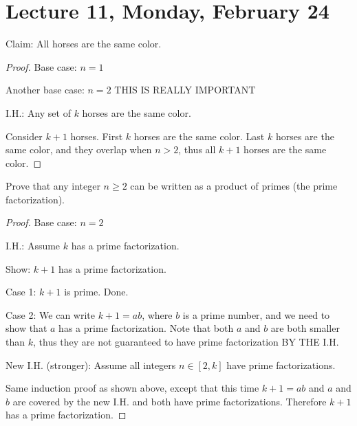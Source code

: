 \section{Lecture 11, Monday, February 24}

\begin{ex}

Claim: All horses are the same color.

\end{ex}

\begin{proof}

Base case: $n = 1$

Another base case: $n = 2$ THIS IS REALLY IMPORTANT

I.H.: Any set of $k$ horses are the same color.

Consider $k + 1$ horses. First $k$ horses are the same color. Last $k$ horses are the same color, and they overlap when $n > 2$, thus all $k + 1$ horses are the same color.

\end{proof}

\begin{ex}

Prove that any integer $n \geq 2$ can be written as a product of primes (the prime factorization).

\end{ex}

\begin{proof}

Base case: $n = 2$

I.H.: Assume $k$ has a prime factorization.

Show: $k + 1$ has a prime factorization. 

Case 1: $k + 1$ is prime. Done.

Case 2: We can write $k + 1 = ab$, where $b$ is a prime number, and we need to show that $a$ has a prime factorization. Note that both $a$ and $b$ are both smaller than $k$, thus they are not guaranteed to have prime factorization BY THE I.H.

New I.H. (stronger): Assume all integers $n \in [2, k]$ have prime factorizations. 

Same induction proof as shown above, except that this time $k + 1 = ab$ and $a$ and $b$ are covered by the new I.H. and both have prime factorizations. Therefore $k + 1$ has a prime factorization.

\end{proof}

